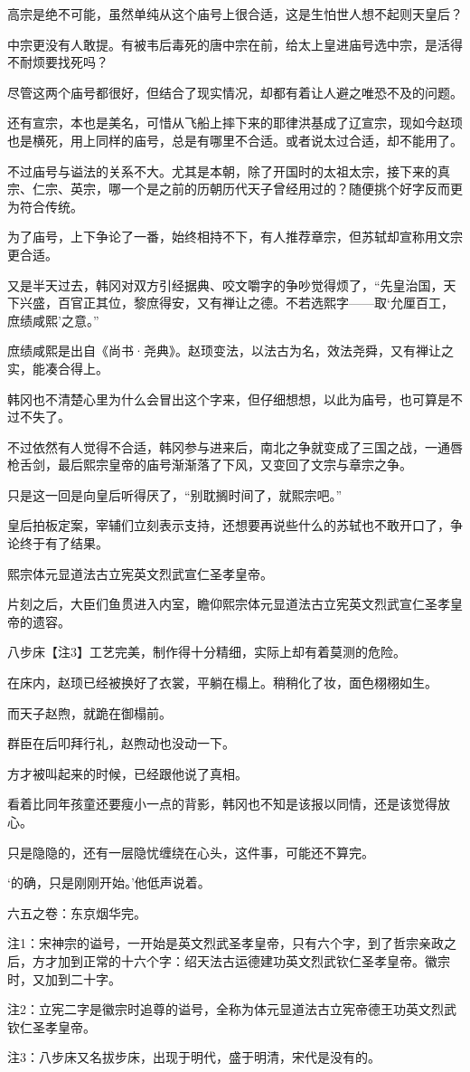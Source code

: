 高宗是绝不可能，虽然单纯从这个庙号上很合适，这是生怕世人想不起则天皇后？

中宗更没有人敢提。有被韦后毒死的唐中宗在前，给太上皇进庙号选中宗，是活得不耐烦要找死吗？

尽管这两个庙号都很好，但结合了现实情况，却都有着让人避之唯恐不及的问题。

还有宣宗，本也是美名，可惜从飞船上摔下来的耶律洪基成了辽宣宗，现如今赵顼也是横死，用上同样的庙号，总是有哪里不合适。或者说太过合适，却不能用了。

不过庙号与谥法的关系不大。尤其是本朝，除了开国时的太祖太宗，接下来的真宗、仁宗、英宗，哪一个是之前的历朝历代天子曾经用过的？随便挑个好字反而更为符合传统。

为了庙号，上下争论了一番，始终相持不下，有人推荐章宗，但苏轼却宣称用文宗更合适。

又是半天过去，韩冈对双方引经据典、咬文嚼字的争吵觉得烦了，“先皇治国，天下兴盛，百官正其位，黎庶得安，又有禅让之德。不若选熙字——取‘允厘百工，庶绩咸熙’之意。”

庶绩咸熙是出自《尚书·尧典》。赵顼变法，以法古为名，效法尧舜，又有禅让之实，能凑合得上。

韩冈也不清楚心里为什么会冒出这个字来，但仔细想想，以此为庙号，也可算是不过不失了。

不过依然有人觉得不合适，韩冈参与进来后，南北之争就变成了三国之战，一通唇枪舌剑，最后熙宗皇帝的庙号渐渐落了下风，又变回了文宗与章宗之争。

只是这一回是向皇后听得厌了，“别耽搁时间了，就熙宗吧。”

皇后拍板定案，宰辅们立刻表示支持，还想要再说些什么的苏轼也不敢开口了，争论终于有了结果。

熙宗体元显道法古立宪英文烈武宣仁圣孝皇帝。

片刻之后，大臣们鱼贯进入内室，瞻仰熙宗体元显道法古立宪英文烈武宣仁圣孝皇帝的遗容。

八步床【注3】工艺完美，制作得十分精细，实际上却有着莫测的危险。

在床内，赵顼已经被换好了衣裳，平躺在榻上。稍稍化了妆，面色栩栩如生。

而天子赵煦，就跪在御榻前。

群臣在后叩拜行礼，赵煦动也没动一下。

方才被叫起来的时候，已经跟他说了真相。

看着比同年孩童还要瘦小一点的背影，韩冈也不知是该报以同情，还是该觉得放心。

只是隐隐的，还有一层隐忧缠绕在心头，这件事，可能还不算完。

‘的确，只是刚刚开始。’他低声说着。

六五之卷：东京烟华完。

注1：宋神宗的谥号，一开始是英文烈武圣孝皇帝，只有六个字，到了哲宗亲政之后，方才加到正常的十六个字：绍天法古运德建功英文烈武钦仁圣孝皇帝。徽宗时，又加到二十字。

注2：立宪二字是徽宗时追尊的谥号，全称为体元显道法古立宪帝德王功英文烈武钦仁圣孝皇帝。

注3：八步床又名拔步床，出现于明代，盛于明清，宋代是没有的。
